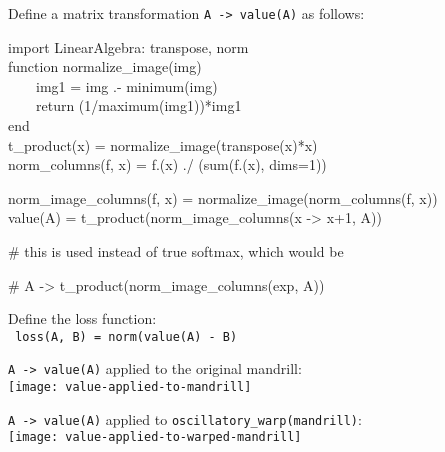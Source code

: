 \documentclass{beamer}
\newcommand{\msmagenta}[1]{{\color{mymagenta} #1}}
\begin{document}
\begin{frame}

Define a matrix transformation \msmagenta{\footnotesize\tt A -> value(A)} as follows:\\[3ex]

{\footnotesize\tt

import LinearAlgebra: transpose, norm\\[1ex]

function normalize\_image(img)\\
\ \ \ \ img1 = img .- minimum(img)\\
\ \ \ \ return (1/maximum(img1))*img1\\
end\\[1ex]

t\_product(x) = normalize\_image(transpose(x)*x)\\[1ex]

norm\_columns(f, x) = f.(x) ./ (sum(f.(x), dims=1))

norm\_image\_columns(f, x) = normalize\_image(norm\_columns(f, x))\\[1ex]

value(A) = t\_product(norm\_image\_columns(x -> x+1, A))

\# this is used instead of true softmax, which would be
 
\# A -> t\_product(norm\_image\_columns(exp, A))\\[3ex]
}

Define the loss function:\\[1ex]

\msmagenta{\footnotesize\tt
loss(A, B) = norm(value(A) - B)
}

\end{frame}

\begin{frame}

{\footnotesize\tt A -> value(A)} applied to the original mandrill:\\[2ex]

\texttt{[image: value-applied-to-mandrill]}

{\footnotesize\tt A -> value(A)} applied to \msmagenta{\footnotesize\tt oscillatory\_warp(mandrill)}:\\[2ex]

\texttt{[image: value-applied-to-warped-mandrill]}

\end{frame}
\end{document}

